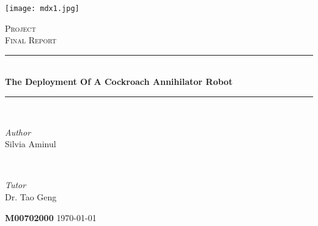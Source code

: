 \documentclass[11pt]{article}
\begin{document}
	
	\fancyhead{} %
	\fancyfoot{} %
	\fancyfoot[CO]{\thepage}
	\begin{titlepage}	
		\centering
		
		\newcommand{\HRule}{\rule{\linewidth}{0.7mm }} %
		\newcommand{\Botline}{\rule{\linewidth}{0.4mm }} %
		
		
		\texttt{[image: mdx1.jpg]}
		
		\textsc{\Large Project }\\[0.5cm] %
		
		\textsc{\large  Final Report}\\[0.5cm] %
		
		
		\HRule\\[0.4cm]
		
		{\huge\bfseries  The Deployment Of A Cockroach Annihilator Robot}\\[0.4cm] %
		
		\Botline\\[1.5cm]
		
		
		\begin{minipage}{0.4\textwidth}
			\begin{flushleft}
				\large
				\textit{Author}\\
				Silvia Aminul 
			\end{flushleft}
		\end{minipage}
		~
		\begin{minipage}{0.4\textwidth}
			\begin{flushright}
				\large
				\textit{Tutor}\\
				Dr. Tao Geng  
			\end{flushright}
			
			
		\end{minipage}
		
		
		\vfill\vfill\vfill
		
		\vfill
		
		
		
		{\bfseries M00702000 }
		\vfill
		{\large\today}
	\end{titlepage}
	\newpage
	\tableofcontents
	
\end{document}
